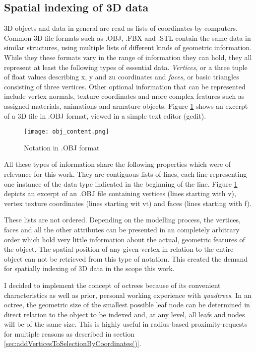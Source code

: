		\subsection{Spatial indexing of 3D data}
		\label{sec:impl_spatial_indexing_3d}
3D objects and data in general are read as lists of coordinates by computers. Common 3D file formats such as .OBJ, .FBX and .STL contain the same data in similar structures, using multiple lists of different kinds of geometric information. While they these formats vary in the range of information they can hold, they all represent at least the following types of essential data. \textit{Vertices}, or a three tuple of float values describing x, y and zu coordinates and \textit{faces}, or basic triangles consisting of three vertices. Other optional information that can be represented include vertex normals, texture coordinates and more complex features such as assigned materials, animations and armature objects. Figure \ref{fig:obj_content} shows an excerpt of a 3D file in .OBJ format, viewed in a simple text editor (gedit).

\begin{figure}[htb]
  \centering
  \texttt{[image: obj\_content.png]}\\ %
  \caption{Notation in .OBJ format}\label{fig:obj_content}
\end{figure}

All these types of information share the following properties which were of relevance for this work. They are contiguous lists of lines, each line representing one instance of the data type indicated in the beginning of the line. Figure \ref{fig:obj_content} depicts an excerpt of an .OBJ file containing vertices (lines starting with v), vertex texture coordinates (lines starting wit vt) and faces (lines starting with f).

These lists are not ordered. Depending on the modelling process, the vertices, faces and all the other attributes can be presented in an completely arbitrary order which hold very little information about the actual, geometric features of the object. The spatial position of any given vertex in relation to the entire object can not be retrieved from this type of notation. This created the demand for spatially indexing of 3D data in the scope this work.

I decided to implement the concept of octrees \cite{Octree} because of its convenient characteristics as well as prior, personal working experience with \textit{quadtrees}. In an octree, the geometric size of the smallest possible leaf node can be determined in direct relation to the object to be indexed and, at any level, all leafs and nodes will be of the same size. This is highly useful in radius-based proximity-requests for multiple reasons as described in section \ref{sec:addVerticesToSelectionByCoordinates()}.


